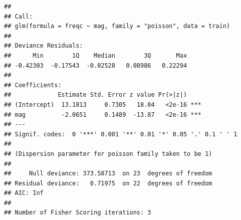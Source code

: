 \begin{verbatim}
## 
## Call:
## glm(formula = freqc ~ mag, family = "poisson", data = train)
## 
## Deviance Residuals: 
##      Min        1Q    Median        3Q       Max  
## -0.42303  -0.17543  -0.02528   0.08986   0.22294  
## 
## Coefficients:
##             Estimate Std. Error z value Pr(>|z|)    
## (Intercept)  13.1813     0.7305   18.04   <2e-16 ***
## mag          -2.0651     0.1489  -13.87   <2e-16 ***
## ---
## Signif. codes:  0 '***' 0.001 '**' 0.01 '*' 0.05 '.' 0.1 ' ' 1
## 
## (Dispersion parameter for poisson family taken to be 1)
## 
##     Null deviance: 373.58713  on 23  degrees of freedom
## Residual deviance:   0.71975  on 22  degrees of freedom
## AIC: Inf
## 
## Number of Fisher Scoring iterations: 3
\end{verbatim}

